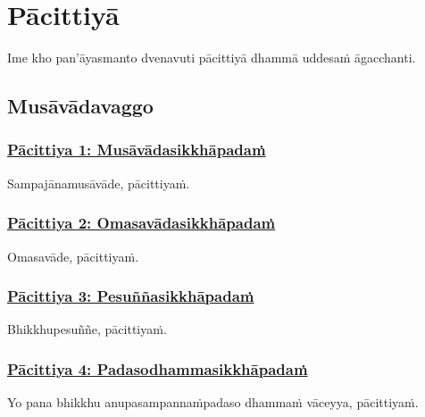 
\section{Pācittiyā}
\label{pc}

\begin{intro}
	Ime kho pan'āyasmanto dvenavuti pācittiyā dhammā uddesaṁ āgacchanti.
\end{intro}

\subsection{Musāvādavaggo}

\subsubsection*{\hyperref[exp1]{Pācittiya 1: Musāvādasikkhāpadaṁ}}
\label{pac1}

Sampajānamusāvāde, pācittiyaṁ.



\subsubsection*{\hyperref[exp2]{Pācittiya 2: Omasavādasikkhāpadaṁ}}
\label{pac2}

Omasavāde, pācittiyaṁ.



\subsubsection*{\hyperref[exp3]{Pācittiya 3: Pesuññasikkhāpadaṁ}}
\label{pac3}

Bhikkhupesuññe, pācittiyaṁ.



\subsubsection*{\hyperref[exp4]{Pācittiya 4: Padasodhammasikkhāpadaṁ}}
\label{pac4}

Yo pana bhikkhu anupasampannaṁ\makeatletter\hyperlink{endnote226-appendix}\makeatother \thinspace padaso dhammaṁ vāceyya, pācittiyaṁ.



